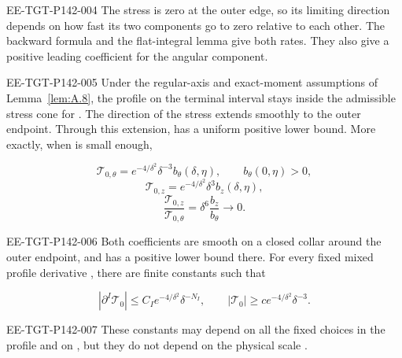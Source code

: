 \begin{EESegment}{EE-TGT-P142-004}
The stress is zero at the outer edge, so its limiting direction depends on how fast its two components go to zero
relative to each other. The backward formula and the flat-integral lemma give both rates. They also give a positive
leading coefficient for the angular component.
\end{EESegment}

\begin{proposition}\label{prop:A.10}
\begin{EESegment}{EE-TGT-P142-005}
Under the regular-axis and exact-moment assumptions of Lemma~\ref{lem:A.8}, the profile on the terminal interval stays
inside the admissible stress cone for . The direction of the stress extends smoothly
to the outer endpoint. Through this extension,
 has a uniform positive lower bound. More exactly, when
 is small enough,
\end{EESegment}
\begin{equation}
  \mathcal T_{0,\theta}=e^{-4/\delta^2}\delta^{-3}b_\theta(\delta,\eta),
  \qquad b_\theta(0,\eta)>0,
  \tag{A.48}\label{eq:A.48}
\end{equation}
\begin{equation}
  \mathcal T_{0,z}=e^{-4/\delta^2}\delta^3b_z(\delta,\eta),
  \tag{A.49}\label{eq:A.49}
\end{equation}
\begin{equation}
  \frac{\mathcal T_{0,z}}{\mathcal T_{0,\theta}}=\delta^6\frac{b_z}{b_\theta}\longrightarrow 0.
  \tag{A.50}\label{eq:A.50}
\end{equation}
\begin{EESegment}{EE-TGT-P142-006}
Both coefficients are smooth on a closed collar around the outer endpoint, and
 has a positive lower bound there. For every fixed mixed profile derivative
, there are finite constants  such that
\end{EESegment}
\begin{equation}
  |\partial^I\mathcal T_0|\leq C_Ie^{-4/\delta^2}\delta^{-N_I},
  \qquad |\mathcal T_0|\geq ce^{-4/\delta^2}\delta^{-3}.
  \tag{A.51}\label{eq:A.51}
\end{equation}
\begin{EESegment}{EE-TGT-P142-007}
These constants may depend on all the fixed choices in the profile and on , but they do not
depend on the physical scale .
\end{EESegment}
\end{proposition}

